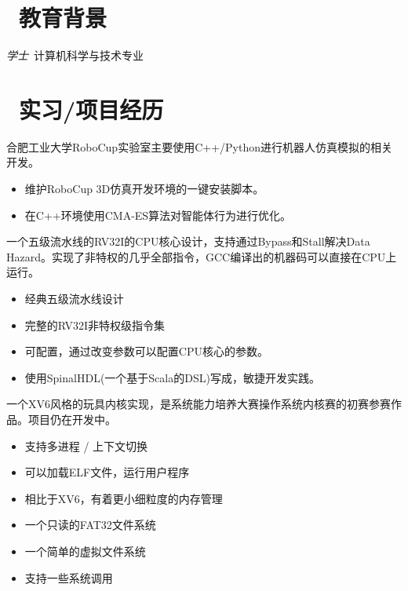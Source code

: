 \documentclass{resume}
\begin{document}


 
\section{\faGraduationCap\  教育背景}
\textit{学士}\ 计算机科学与技术专业

\section{\faUsers\ 实习/项目经历}
\role{3D仿真开发小组成员}{}
\begin{onehalfspacing}
合肥工业大学RoboCup实验室主要使用C++/Python进行机器人仿真模拟的相关开发。
\begin{itemize}
  \item 维护RoboCup 3D仿真开发环境的一键安装脚本。
  \item 在C++环境使用CMA-ES算法对智能体行为进行优化。
\end{itemize}
\end{onehalfspacing}

\begin{onehalfspacing}
一个五级流水线的RV32I的CPU核心设计，支持通过Bypass和Stall解决Data Hazard。实现了非特权的几乎全部指令，GCC编译出的机器码可以直接在CPU上运行。
\begin{itemize}
  \item 经典五级流水线设计
  \item 完整的RV32I非特权级指令集
  \item 可配置，通过改变参数可以配置CPU核心的参数。
  \item 使用SpinalHDL(一个基于Scala的DSL)写成，敏捷开发实践。
\end{itemize}
\end{onehalfspacing}

\begin{onehalfspacing}
一个XV6风格的玩具内核实现，是系统能力培养大赛操作系统内核赛的初赛参赛作品。项目仍在开发中。
\begin{itemize}
  \item 支持多进程 / 上下文切换
  \item 可以加载ELF文件，运行用户程序
  \item 相比于XV6，有着更小细粒度的内存管理
  \item 一个只读的FAT32文件系统
  \item 一个简单的虚拟文件系统
  \item 支持一些系统调用
\end{itemize}
\end{onehalfspacing}
\end{document}
